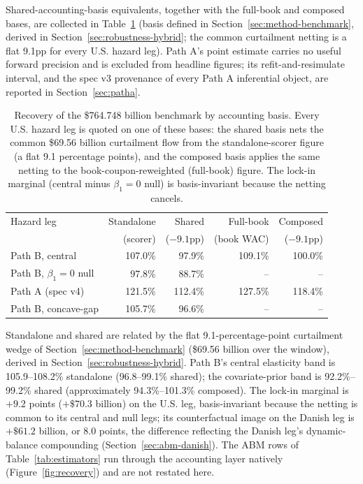 \documentclass[12pt]{article}
\begin{document}
\begin{table}[H]
\begin{threeparttable}
\begin{tablenotes}[flushleft]
\item Shared-accounting-basis equivalents, together with the full-book and composed bases, are collected in Table~\ref{tab:bases} (basis defined in Section~\ref{sec:method-benchmark}, derived in Section~\ref{sec:robustness-hybrid}; the common curtailment netting is a flat 9.1pp for every U.S. hazard leg). Path A's point estimate carries no useful forward precision and is excluded from headline figures; its refit-and-resimulate interval, and the spec v3 provenance of every Path A inferential object, are reported in Section~\ref{sec:patha}.
\end{tablenotes}
\end{threeparttable}
\end{table}

\begin{table}[H]
\centering
\footnotesize
\begin{threeparttable}
\caption{Recovery of the \$764.748 billion benchmark by accounting basis. Every U.S. hazard leg is quoted on one of these bases: the shared basis nets the common \$69.56 billion curtailment flow from the standalone-scorer figure (a flat 9.1 percentage points), and the composed basis applies the same netting to the book-coupon-reweighted (full-book) figure. The lock-in marginal (central minus $\beta_1 = 0$ null) is basis-invariant because the netting cancels.}
\label{tab:bases}
\begin{tabular}{@{}lrrrr@{}}
\toprule
Hazard leg & Standalone & Shared & Full-book & Composed \\
 & (scorer) & ($-9.1$pp) & (book WAC) & ($-9.1$pp) \\
\midrule
Path B, central & 107.0\% & 97.9\% & 109.1\% & 100.0\% \\
Path B, $\beta_1 = 0$ null & 97.8\% & 88.7\% & -- & -- \\
Path A (spec v4) & 121.5\% & 112.4\% & 127.5\% & 118.4\% \\
Path B, concave-gap & 105.7\% & 96.6\% & -- & -- \\
\bottomrule
\end{tabular}
\begin{tablenotes}[flushleft]\scriptsize
\item Standalone and shared are related by the flat 9.1-percentage-point curtailment wedge of Section~\ref{sec:method-benchmark} (\$69.56 billion over the window), derived in Section~\ref{sec:robustness-hybrid}. Path B's central elasticity band is 105.9--108.2\% standalone (96.8--99.1\% shared); the covariate-prior band is 92.2\%--99.2\% shared (approximately 94.3\%--101.3\% composed). The lock-in marginal is $+9.2$ points ($+\$70.3$ billion) on the U.S. leg, basis-invariant because the netting is common to its central and null legs; its counterfactual image on the Danish leg is $+\$61.2$ billion, or 8.0 points, the difference reflecting the Danish leg's dynamic-balance compounding (Section~\ref{sec:abm-danish}). The ABM rows of Table~\ref{tab:estimators} run through the accounting layer natively (Figure~\ref{fig:recovery}) and are not restated here.

\end{tablenotes}
\end{threeparttable}
\end{table}
\end{document}
